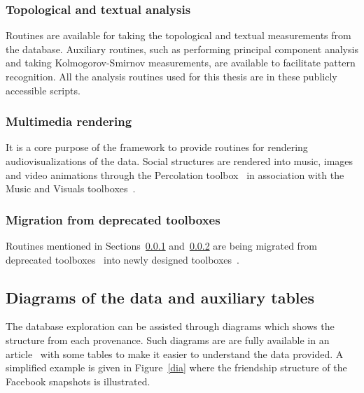 \subsubsection{Topological and textual analysis}\label{ana}
Routines are available for taking the topological and textual measurements from
the database.
Auxiliary routines, such as performing principal component analysis
and taking Kolmogorov-Smirnov measurements, are available
to facilitate pattern recognition.
All the analysis routines used for this thesis are in these publicly accessible scripts.

\subsubsection{Multimedia rendering}\label{media}
It is a core purpose of the framework to provide routines for rendering
audiovisualizations of the data.
Social structures are rendered into music, images and video animations
through the Percolation toolbox~\cite{percolation} in association with
the Music and Visuals toolboxes~\cite{music,visuals}.

\subsubsection{Migration from deprecated toolboxes}
Routines mentioned in Sections~\ref{ana} and~\ref{media} are being migrated from deprecated
toolboxes~\cite{gmaneLegacy,percolationLegacy} into newly designed
toolboxes~\cite{percolation,visuals}.

\subsection{Diagrams of the data and auxiliary tables}
The database exploration can be assisted through diagrams which shows
the structure from each provenance.
Such diagrams are
are fully available in an article~\cite{losd}
with some tables to make it easier to understand the data provided.
A simplified example is given in Figure~\ref{dia} where the friendship
structure of the Facebook snapshots is illustrated.


